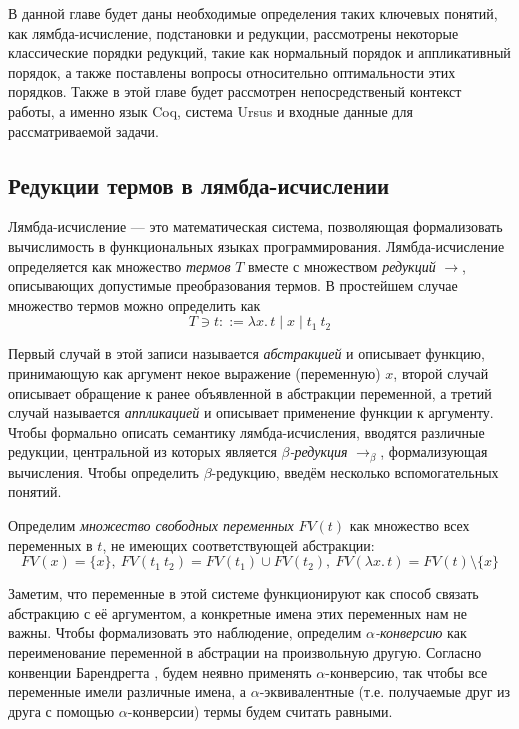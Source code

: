 \documentclass[../diploma.tex]{subfiles}
\begin{document}
\label{sec:1}

В данной главе будет даны необходимые определения таких ключевых понятий, как лямбда-исчисление, подстановки и редукции, рассмотрены некоторые классические порядки редукций, такие как нормальный порядок и аппликативный порядок, а также поставлены вопросы относительно оптимальности этих порядков. Также в этой главе будет рассмотрен непосредственый контекст работы, а именно язык Coq, система Ursus и входные данные для рассматриваемой задачи.

\subsection{Редукции термов в лямбда-исчислении}

Лямбда-исчисление \cite{lambda_calculus} --- это математическая система, позволяющая формализовать вычислимость в функциональных языках программирования. Лямбда-исчисление определяется как множество \textit{термов} $T$ вместе с множеством \textit{редукций} $\rightarrow$, описывающих допустимые преобразования термов. В простейшем случае множество термов можно определить как
$$T \ni t ::= \lambda x.\, t \mid x \mid t_1\ t_2$$

Первый случай в этой записи называется \textit{абстракцией} и описывает функцию, принимающую как аргумент некое выражение (переменную) $x$, второй случай описывает обращение к ранее объявленной в абстракции переменной, а третий случай называется \textit{аппликацией} и описывает применение функции к аргументу. Чтобы формально описать семантику лямбда-исчисления, вводятся различные редукции, центральной из которых является \textit{$\beta$-редукция} $\rightarrow_\beta$, формализующая вычисления. Чтобы определить $\beta$-редукцию, введём несколько вспомогательных понятий.

Определим \textit{множество свободных переменных} $FV(t)$ как множество всех переменных в $t$, не имеющих соответствующей абстракции:
$$FV(x) = \{x\},\ FV(t_1\ t_2) = FV(t_1) \cup FV(t_2),\ FV(\lambda x.\, t) = FV(t) \setminus \{x\}$$

Заметим, что переменные в этой системе функционируют как способ связать абстракцию с её аргументом, а конкретные имена этих переменных нам не важны. Чтобы формализовать это наблюдение, определим \textit{$\alpha$-конверсию} как переименование переменной в абстрации на произвольную другую. Согласно конвенции Барендрегта \cite{lambda_calculus}, будем неявно применять $\alpha$-конверсию, так чтобы все переменные имели различные имена, а $\alpha$-эквивалентные (т.е. получаемые друг из друга с помощью $\alpha$-конверсии) термы будем считать равными.
\end{document}
